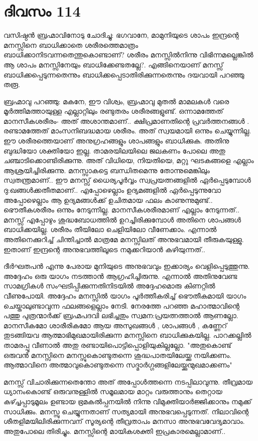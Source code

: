  
\section{ദിവസം 114}


വസിഷ്ഠന്‍ ബ്രഹ്മാവിനോടു ചോദിച്ചു: ഭഗവാനേ, മാമുനിയുടെ ശാപം ഇന്ദ്രന്റെ മനസ്സിനെ ബാധിക്കാതെ ശരീരത്തെമാത്രം ബാധിക്കാനിടവന്നതെന്തുകൊണ്ടാണ്‌? ശരീരം മനസ്സില്‍നിന്നു വിഭിന്നമല്ലെങ്കില്‍ ആ ശാപം മനസ്സിനേയും ബാധിക്കേണ്ടതല്ലേ?. എങ്ങിനെയാണ്‌ മനസ്സ്‌ ബാധിക്കപ്പെടുന്നതെന്നും ബാധിക്കപ്പെടാതിരിക്കുന്നതെന്നും ദയവായി പറഞ്ഞു തരൂ.

ബ്രഹ്മാവു പറഞ്ഞു: മകനേ, ഈ വിശ്വം, ബ്രഹ്മാവു മുതല്‍ മാമലകള്‍ വരെ മൂര്‍ത്തിമത്തായുള്ള എല്ലാറ്റിലും രണ്ടുതരം ശരീരങ്ങളുണ്ട്‌. ഒന്നാമത്തേത്‌ മാനസീകശരീരം- അത്‌ അശാന്തമാണ്‌.. ക്ഷിപ്രമാണതിന്റെ പ്രവര്‍ത്തനങ്ങള്‍ . രണ്ടാമത്തേത്‌ മാംസനിബദ്ധമായ ശരീരം. അത്‌ സ്വയമായി ഒന്നും ചെയ്യുന്നില്ല. ഈ ശരീരത്തെയാണ്‌ അനുഗ്രഹങ്ങളും ശാപങ്ങളും ബാധിക്കുക. അതിനു ബുദ്ധിയോ ശക്തിയോ ഇല്ല. താമരയിലയിലെ ജലകണം പോലെ അതു ചഞ്ചാടിക്കൊണ്ടിരിക്കുന്നു. അത്‌ വിധിയെ, നിയതിയെ, മറ്റു ഘടകങ്ങളെ എല്ലാം ആശ്രയിച്ചിരിക്കുന്നു. മനസ്സാകട്ടെ ബന്ധിതമെന്നു തോന്നുമെങ്കിലും സ്വതന്ത്രമാണ്‌.. ഈ മനസ്സ്‌ ധൈര്യപൂര്‍വ്വം സ്വപ്രയത്നങ്ങളില്‍ ഏര്‍പ്പെടുമ്പോള്‍ ദു:ഖങ്ങള്‍ക്കതീതമാണ്‌.. എപ്പോഴെല്ലാം ഉദ്യമങ്ങളില്‍ ഏര്‍പ്പെടുന്നുവോ അപ്പോഴെല്ലാം ആ ഉദ്യമങ്ങള്‍ക്ക്‌ ഉചിതമായ ഫലം കാണുന്നുമുണ്ട്‌.. ഭൌതീകശരീരം ഒന്നും നേടുന്നില്ല. മാനസീകശരീരമാണ്‌ എല്ലാം നേടുന്നത്‌.. മനസ്സ്‌ എപ്പോഴും ശുദ്ധബോധത്തില്‍ ഉറച്ചിരിക്കുമ്പോള്‍ അതിനെ ശാപങ്ങള്‍ ബാധിക്കയില്ല. ശരീരം തീയിലോ ചെളിയിലോ വീണേക്കാം. എന്നാല്‍ അതിനെക്കുറിച്ച്‌ ചിന്തിച്ചാല്‍ മാത്രമേ മനസ്സിലത് അനുഭവമായി തീരുകയുള്ളു. ഇതാണ്‌ ഇന്ദ്രന്റെ അനുഭവത്തിലൂടെ നമുക്കറിയാന്‍ കഴിയുന്നത്‌..

ദീര്‍ഘതപന്‍ എന്നു പേരായ മുനിയുടെ അനുഭവവും ഇക്കാര്യം വെളിപ്പെടുത്തുന്നു. അദ്ദേഹം ഒരു യാഗം നടത്താന്‍ ആഗ്രഹിച്ചിരുന്നു. എന്നാല്‍ അതിനുവേണ്ട സാമഗ്രികള്‍ സംഘടിപ്പിക്കുന്നതിനിടയില്‍ അദ്ദേഹമൊരു കിണറ്റില്‍ വീണുപോയി. അദ്ദേഹം മനസ്സില്‍ യാഗം പൂര്‍ത്തീകരിച്ച്‌ ഭൌതീകമായി യാഗം ചെയ്താലുണ്ടാവുന്ന ഫലങ്ങളെല്ലാം നേടി. നേരത്തേ പറഞ്ഞ മഹാത്മാവിന്റെ പത്തു പുത്രന്മാര്‍ക്ക്‌ ബ്രഹ്മപദവി ലഭിച്ചതും സ്വമന:പ്രയത്നത്താല്‍ ആണല്ലോ. മാനസീകമോ ശാരീരികമോ ആയ അസുഖങ്ങള്‍ , ശാപങ്ങള്‍ , കണ്ണേറ്‌  തുടങ്ങിയവ ആത്മാഭിമുഖമായിരിക്കുന്ന മനസ്സിനെ ബാധിക്കുകയില്ല. പാറക്കല്ലില്‍ താമരപ്പൂ വീണാല്‍ അതു രണ്ടായിപൊട്ടിപ്പൊളിയുകില്ലല്ലോ. "അതുകൊണ്ട്‌ ഒരുവന്‍ മനസ്സിനെ മനസ്സുകൊണ്ടുതന്നെ ശുദ്ധപാതയിലേയ്ക്കു നയിക്കണം. ആത്മാവിനെ അത്മാവുകൊണ്ടുതന്നെ സദ്മാര്‍ഗ്ഗങ്ങളിലേയ്ക്കുന്മുഖമാക്കണം"

മനസ്സ്  വിചാരിക്കുന്നതെന്തോ അത്‌ അപ്പോള്‍ത്തന്നെ നടപ്പിലാവുന്നു. തീവ്രമായ ധ്യാനംകൊണ്ട്‌ ഒരുവനുള്ളില്‍ സമൂലമായ മാറ്റം വരുത്താനും തെറ്റായ കഴ്ച്ചപ്പാടുമൂലം ഉണ്ടായ ഭ്രമകല്‍പ്പനയില്‍ നിന്നു വിമുക്തിയാര്‍ജ്ജിക്കാനും നമുക്ക്  സാധിക്കും. മനസ്സു ചെയ്യുന്നതാണ്‌ സത്യമായി അനുഭവപ്പെടുന്നത്‌. നിലാവിന്റെ ശീതളിമയിലിരിക്കുന്നവന്‌ സൂര്യന്റെ തീവ്രതാപം മനസാ അനുഭവവേദ്യമാവാം. അതുപോലെ തിരിച്ചും. മനസ്സിന്റെ മായികശക്തി ഇപ്രകാരമെല്ലാമാണ്‌.. 

